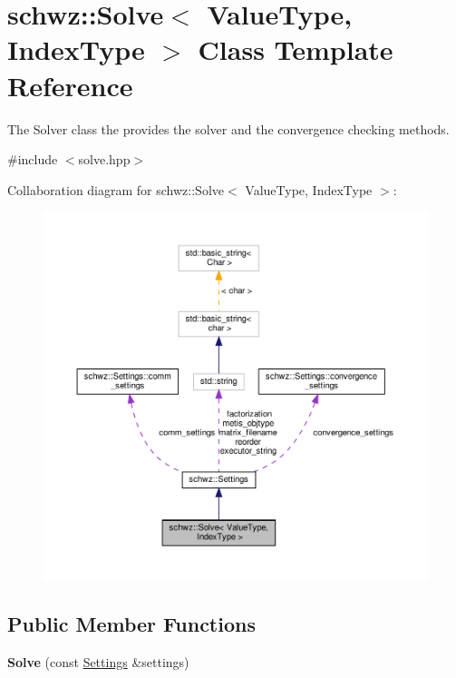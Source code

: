 \hypertarget{classschwz_1_1Solve}{}\section{schwz\+:\+:Solve$<$ Value\+Type, Index\+Type $>$ Class Template Reference}
\label{classschwz_1_1Solve}


The Solver class the provides the solver and the convergence checking methods.  




{\ttfamily \#include $<$solve.\+hpp$>$}



Collaboration diagram for schwz\+:\+:Solve$<$ Value\+Type, Index\+Type $>$\+:
\nopagebreak
\begin{figure}[H]
\begin{center}
\leavevmode
\includegraphics[width=350pt]{classschwz_1_1Solve__coll__graph}
\end{center}
\end{figure}
\subsection*{Public Member Functions}
\begin{DoxyCompactItemize}
\item 
\mbox{\label{classschwz_1_1Solve_a24250987949518cc92649066d3ce147d}} 
{\bfseries Solve} (const \hyperlink{structschwz_1_1Settings}{Settings} \&settings)
\end{DoxyCompactItemize}
